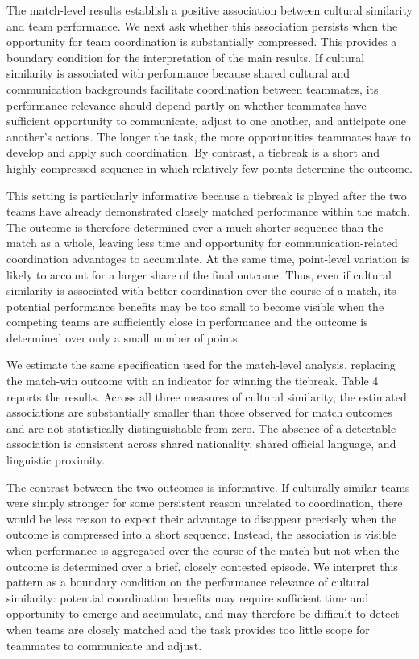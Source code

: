 \documentclass[10pt]{article}
\begin{document}
The match-level results establish a positive association between cultural similarity and team performance. We next ask whether this association persists when the opportunity for team coordination is substantially compressed. This provides a boundary condition for the interpretation of the main results. If cultural similarity is associated with performance because shared cultural and communication backgrounds facilitate coordination between teammates, its performance relevance should depend partly on whether teammates have sufficient opportunity to communicate, adjust to one another, and anticipate one another's actions. The longer the task, the more opportunities teammates have to develop and apply such coordination. By contrast, a tiebreak is a short and highly compressed sequence in which relatively few points determine the outcome.

This setting is particularly informative because a tiebreak is played after the two teams have already demonstrated closely matched performance within the match. The outcome is therefore determined over a much shorter sequence than the match as a whole, leaving less time and opportunity for communication-related coordination advantages to accumulate. At the same time, point-level variation is likely to account for a larger share of the final outcome. Thus, even if cultural similarity is associated with better coordination over the course of a match, its potential performance benefits may be too small to become visible when the competing teams are sufficiently close in performance and the outcome is determined over only a small number of points.

We estimate the same specification used for the match-level analysis, replacing the match-win outcome with an indicator for winning the tiebreak. Table 4 reports the results. Across all three measures of cultural similarity, the estimated associations are substantially smaller than those observed for match outcomes and are not statistically distinguishable from zero. The absence of a detectable association is consistent across shared nationality, shared official language, and linguistic proximity.

The contrast between the two outcomes is informative. If culturally similar teams were simply stronger for some persistent reason unrelated to coordination, there would be less reason to expect their advantage to disappear precisely when the outcome is compressed into a short sequence. Instead, the association is visible when performance is aggregated over the course of the match but not when the outcome is determined over a brief, closely contested episode. We interpret this pattern as a boundary condition on the performance relevance of cultural similarity: potential coordination benefits may require sufficient time and opportunity to emerge and accumulate, and may therefore be difficult to detect when teams are closely matched and the task provides too little scope for teammates to communicate and adjust.
\end{document}
